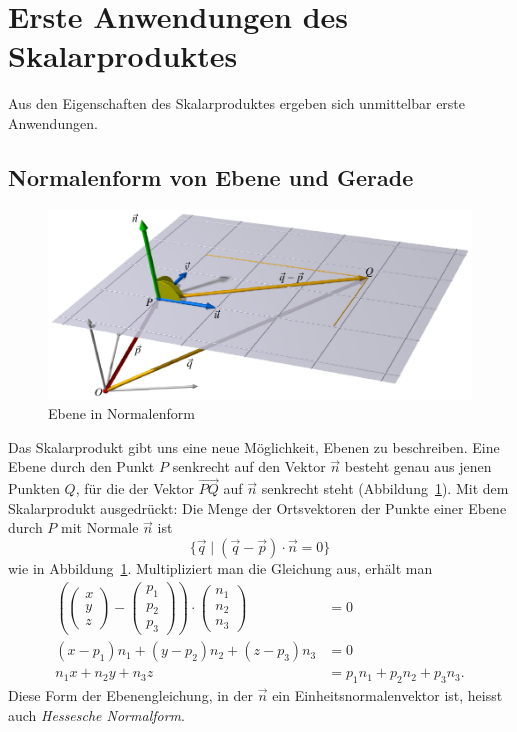 %
%
%
\section{Erste Anwendungen des Skalarproduktes\label{section:normalform}}
Aus den Eigenschaften des Skalarproduktes ergeben sich unmittelbar
erste Anwendungen.

%
%
\subsection{Normalenform von Ebene und Gerade}
\begin{figure}
\begin{center}
\includegraphics{4/images/normalenform.pdf}
\end{center}
\caption{Ebene in Normalenform\label{image-normalenform}}
\end{figure}
Das Skalarprodukt gibt uns eine neue Möglichkeit, Ebenen zu
beschreiben.
Eine Ebene durch den Punkt $P$ senkrecht auf den Vektor
$\vec n$ besteht genau aus jenen Punkten $Q$, für die der Vektor
$\overset{\rightarrow}{PQ}$ auf $\vec n$ senkrecht steht
(Abbildung~\ref{image-normalenform}).
Mit dem Skalarprodukt
ausgedrückt: Die Menge der Ortsvektoren der Punkte einer Ebene durch $P$ mit
Normale $\vec n$ ist
\[
\{\vec q\;|\;(\vec q-\vec p)\cdot \vec n=0\}
\]
wie in Abbildung~\ref{image-normalenform}.
Multipliziert man die Gleichung aus, erhält man
\begin{align*}
\left(
\begin{pmatrix}x\\y\\z\end{pmatrix}
-\begin{pmatrix}p_1\\p_2\\p_3\end{pmatrix}\right)\cdot
\begin{pmatrix}n_1\\n_2\\n_3\end{pmatrix}&=0
\\
(x-p_1)n_1+(y-p_2)n_2+(z-p_3)n_3&=0
\\
n_1x+n_2y+n_3z&=p_1n_1+p_2n_2+p_3n_3.
\end{align*}
Diese Form der Ebenengleichung, in der $\vec n$ ein Einheitsnormalenvektor ist,
heisst auch {\em Hessesche Normalform}.

